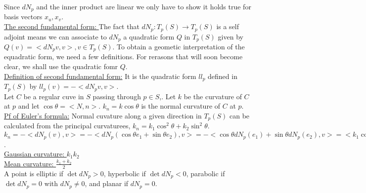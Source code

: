\documentclass[12pt,letterpaper]{hmcpset}
\begin{document}
Since $dN_p$ and the inner product are linear we only have to show it holds true
for basis vectors $x_u, x_v$.  \\
\underline{The second fundamental form: } The fact that $dN_p: T_p(S) \rightarrow T_p(S)$
is a self adjoint means we can associate to $dN_p$ a quadratic form $Q$ in
$T_p(S)$ given by $Q(v) = <dN_pv, v>, v \in T_p(S)$. To obtain a geometic
interpretation of the equadratic form, we need  a few definitions. For rerasons
that will soon become clear, we shall use the quadratic fomr $Q$. \\
\underline{Definition of second fundamental form:} It is the quadratic form
$ll_p$ defined in $T_p(S)$ by $ll_p(v) = -<dN_pv, v>$. \\
Let $C$ be a regular cuve in $S$ passing through $p \in S$,. Let $k$ be the
 curvature of $C$ at $p$ and let $\cos \theta = <N, n>$. $k_n = k \cos \theta$ is the
 normal curvature of $C$ at $p$. \\
 \underline{Pf of Euler's formula:} Normal cuvature along a given direction in
 $T_p(S)$ can be calculated from the principal curvaturees, $k_n = k_1 \cos^2 \theta
 + k_2 \sin^2 \theta$.  \\
 $k_n = -<dN_p(v), v> = -<dN_p(\cos \theta e_1 + \sin \theta e_2), v> = -<\cos \theta dN_p(e_1)
 + \sin \theta dN_p(e_2), v> = <k_1 \cos \theta e_1 + k_2 \sin \theta e_2, \cos \theta e_1 + \sin \theta
 e_2> = k_1\cos^2 \theta + k_2 \sin^2 \theta$. \\
 \underline{Gaussian curvature: } $k_1k_2$ \\
 \underline{Mean curvature: } $\frac{k_1 + k_2}{2}$ \\
 A point is elliptic if $\det dN_p > 0$, hyperbolic if $\det dN_p < 0$,
 parabolic if $\det dN_p = 0$ with $dN_p \neq 0$, and planar if $dN_p = 0$.
\end{document}

